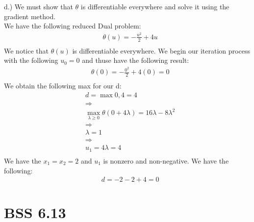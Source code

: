 \documentclass[12pt]{article}
\begin{document}
    d.) We must show that $\theta$ is differentiable everywhere and solve it using the gradient method.\\
    We have the following reduced Dual problem:\\
        \begin{align*}
            &\theta(u) = -\frac{u^2}{2} + 4u\\
        \end{align*}
    We notice that $\theta(u)$ is differentiable everywhere. We begin our iteration process with the following $u_0 = 0$ and thuse have the following result: \\
        \begin{align*}
            &\theta(0) = -\frac{0^2}{2} + 4(0) = 0\\
        \end{align*}
    We obtain the following max for our d:\\
        \begin{align*}
            &d = \max{0,4} = 4\\
            &\Rightarrow\\
            &\max_{\lambda \geq 0} \theta(0+4\lambda) = 16\lambda -8\lambda^2\\
            &\Rightarrow\\
            &\lambda = 1\\
            &\Rightarrow\\
            &u_1=4\lambda = 4\\
        \end{align*}
    We have the $x_1 = x_2 = 2$ and $u_1 $ is nonzero and non-negative. We have the following:\\
        \begin{align*}
            &d=-2-2+4 = 0 
        \end{align*}
\section{BSS 6.13}
\end{document}
